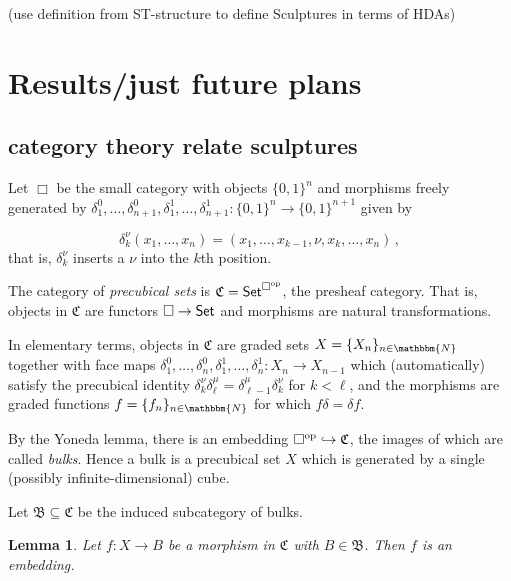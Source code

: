 \documentclass[submission,copyright,creativecommons]{eptcs}
\newcommand\cat[1]{\mathfrak{#1}}
\newcommand\Cub{\cat{C}}
\newcommand\Bulk{\cat{B}}
\newcommand\Set{\textup{\textsf{Set}}}
\newcommand\Nat{\mathbbm{N}}
\newtheorem{lemma}[theorem]{Lemma}
\begin{document}
	\noindent(use definition from ST-structure to define Sculptures in terms of HDAs)
	

\section{Results/just future plans}

\subsection{category theory relate sculptures}
	Let $\Box$ be the small category with objects $\{ 0, 1\}^n$ and morphisms freely generated by $\delta_1^0,\dotsc, \delta_{ n+ 1}^0, \delta_1^1,\dotsc, \delta_{n+1}^1:\{ 0, 1\}^n\to\{ 0, 1\}^{n+1}$ given by

	\begin{equation}
  		\delta_k^\nu( x_1,\dotsc, x_n)=( x_1,\dotsc, x_{ k- 1}, \nu, x_k,\dotsc, x_n)\,,
	\end{equation}
	that is, $\delta_k^\nu$ inserts a $\nu$ into the $k$th position.

	The category of \emph{precubical sets} is $\Cub= \Set^{ \Box^\textup{op}}$, the presheaf category. That is, objects in $\Cub$ are functors $\Box\to \Set$ and morphisms are natural transformations.

	In elementary terms, objects in $\Cub$ are graded sets $X=\{ X_n\}_{n\in \Nat}$ together with face maps $\delta_1^0,\dotsc, \delta_n^0, \delta_1^1,\dotsc, \delta_n^1: X_n\to X_{ n- 1}$ which (automatically) satisfy the precubical identity $\delta_k^\nu \delta_\ell^\mu=\delta_{ \ell-1}^\mu \delta_k^\nu$ for $k< \ell$, and the morphisms are graded functions $f=\{ f_n\}_{ n\in \Nat}$ for which $f \delta=\delta f$.

	By the Yoneda lemma, there is an embedding $\Box^\textup{op}\hookrightarrow \Cub$, the images of which are called \emph{bulks}. Hence a bulk is a precubical set $X$ which is generated by a single (possibly infinite-dimensional) cube.

	Let $\Bulk\subseteq \Cub$ be the induced subcategory of bulks.


	\begin{lemma}
  		Let $f: X\to B$ be a morphism in $\Cub$ with $B\in \Bulk$.  Then $f$ is an embedding.
	\end{lemma}
\end{document}

